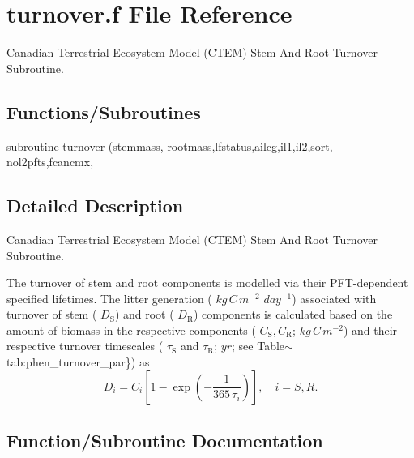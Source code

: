 \hypertarget{turnover_8f}{}\section{turnover.\+f File Reference}
\label{turnover_8f}


Canadian Terrestrial Ecosystem Model (C\+T\+E\+M) Stem And Root Turnover Subroutine.  


\subsection*{Functions/\+Subroutines}
\begin{DoxyCompactItemize}
\item 
subroutine \hyperlink{turnover_8f_a3cab47e670d977409bfe234418add754}{turnover} (stemmass, rootmass,lfstatus,ailcg,il1,il2,sort, nol2pfts,fcancmx,
\end{DoxyCompactItemize}


\subsection{Detailed Description}
Canadian Terrestrial Ecosystem Model (C\+T\+E\+M) Stem And Root Turnover Subroutine. 

The turnover of stem and root components is modelled via their P\+F\+T-\/dependent specified lifetimes. The litter generation ( $kg\,C\,m^{-2}$ $day^{-1}$) associated with turnover of stem ( $D_\mathrm{S}$) and root ( $D_\mathrm{R}$) components is calculated based on the amount of biomass in the respective components ( $C_\mathrm{S}, C_\mathrm{R}$; $kg\,C\,m^{-2}$) and their respective turnover timescales ( $\tau_\mathrm{S}$ and $\tau_\mathrm{R}$; $yr$; see Table$\sim$tab\+:phen\+\_\+turnover\+\_\+par\}) as \[ \label{citod} D_{i} = C_{i}\left[1 - \exp\left(-\frac{1}{365\,\tau_{i}}\right)\right],\quad i = S, R.\] 

\subsection{Function/\+Subroutine Documentation}
\hypertarget{turnover_8f_a3cab47e670d977409bfe234418add754}{}
